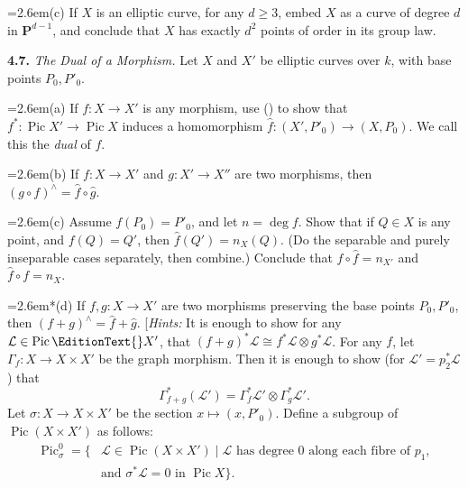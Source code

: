 {\noindent\hangindent=2.6em\hspace*{1.4em}(c) If $X$ is an elliptic curve, for any $d\ge3$, embed $X$ as a curve of degree $d$ in $\mathbf P^{d-1}$, and conclude that $X$ has exactly $d^2$ points of order  in its group law.

\smallskip
\noindent\hypertarget{ex-IV-4.7}{}\textbf{4.7.} \emph{The Dual of a Morphism.} Let $X$ and $X'$ be elliptic curves over $k$, with base points $P_0,P'_0$.

\noindent\hangindent=2.6em\hspace*{1.4em}(a) If $f\colon X\to X'$ is any morphism, use () to show that $f^*\colon\operatorname{Pic}X'\to\operatorname{Pic}X$ induces a homomorphism $\widehat f\colon(X',P'_0)\to(X,P_0)$. We call this the \emph{dual} of $f$.

\noindent\hangindent=2.6em\hspace*{1.4em}(b) If $f\colon X\to X'$ and $g\colon X'\to X''$ are two morphisms, then $(g\circ f)^\wedge=\widehat f\circ\widehat g$.

\noindent\hangindent=2.6em\hspace*{1.4em}(c) Assume $f(P_0)=P'_0$\EditionText{}, and let $n=\deg f$. Show that if $Q\in X$ is any point, and $f(Q)=Q'$, then $\widehat f(Q')=n_X(Q)$. (Do the separable and purely inseparable cases separately, then combine.) Conclude that $f\circ\widehat f=n_{X'}$ and $\widehat f\circ f=n_X$.

\noindent\hangindent=2.6em\hspace*{1.1em}*(d) If $f,g\colon X\to X'$ are two morphisms preserving the base points $P_0,P'_0$, then $(f+g)^\wedge=\widehat f+\widehat g$. [\emph{Hints:} It is enough to show for any $\mathcal L\in\operatorname{Pic}\EditionText{}X'$, that $(f+g)^*\mathcal L\cong f^*\mathcal L\otimes g^*\mathcal L$. For any $f$, let $\Gamma_f\colon X\to X\times X'$ be the graph morphism. Then it is enough to show (for $\mathcal L'=p_2^*\mathcal L$) that
\[
\Gamma_{f+g}^*(\mathcal L')=\Gamma_f^*\mathcal L'\otimes\Gamma_g^*\mathcal L'.
\]
Let $\sigma\colon X\to X\times X'$ be the section $x\mapsto(x,P'_0)$. Define a subgroup of $\operatorname{Pic}(X\times X')$ as follows:
\[
\begin{aligned}
\operatorname{Pic}_\sigma^0=\{&\mathcal L\in\operatorname{Pic}(X\times X')\mid
  \mathcal L\text{ has degree }0\text{ along each fibre of }p_1,\\
 &\text{and }\sigma^*\mathcal L=0\text{ in }\operatorname{Pic}X\}.
\end{aligned}
\]}
